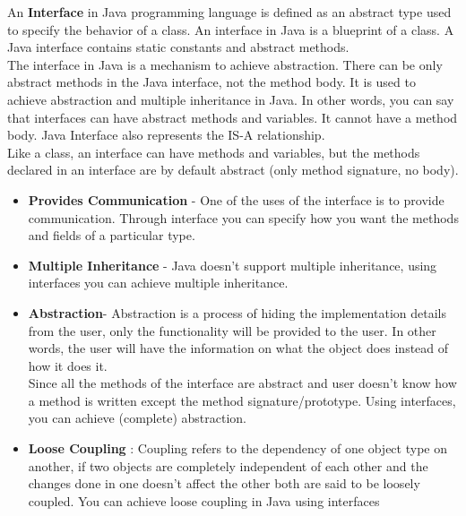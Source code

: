 \documentclass[11pt]{article}
\begin{document}
\begin{enumerate}
	      An \textbf{Interface} in Java programming language is defined as an abstract type used to specify the behavior of a class. An interface in Java is a blueprint of a class. A Java interface contains static constants and abstract methods.\\
	      The interface in Java is a mechanism to achieve abstraction. There can be only abstract methods in the Java interface, not the method body. It is used to achieve abstraction and multiple inheritance in Java. In other words, you can say that interfaces can have abstract methods and variables. It cannot have a method body. Java Interface also represents the IS-A relationship.\\

	      Like a class, an interface can have methods and variables, but the methods declared in an interface are by default abstract (only method signature, no body).

	      \begin{itemize}
		      \item \textbf{Provides Communication} - One of the uses of the interface is to provide communication. Through interface you can specify how you want the methods and fields of a particular type.
		      \item \textbf{Multiple Inheritance}  - Java doesn't support multiple inheritance, using interfaces you can achieve multiple inheritance.
		      \item \textbf{Abstraction}- Abstraction is a process of hiding the implementation details from the user, only the functionality will be provided to the user. In other words, the user will have the information on what the object does instead of how it does it.\\
		            Since all the methods of the interface are abstract and user doesn't know how a method is written except the method signature/prototype. Using interfaces, you can achieve (complete) abstraction.
		      \item \textbf{Loose Coupling} :  Coupling refers to the dependency of one object type on another, if two objects are completely independent of each other and the changes done in one doesn't affect the other both are said to be loosely coupled.
		            You can achieve loose coupling in Java using interfaces

	      \end{itemize}


\end{enumerate}
\end{document}
